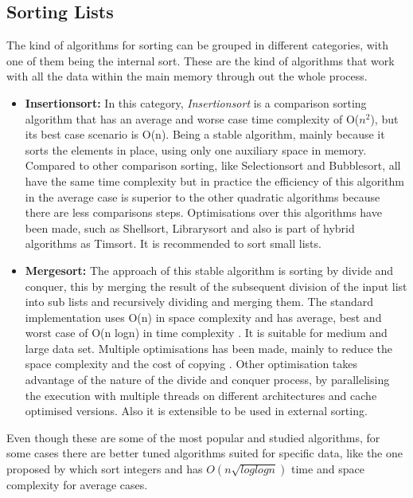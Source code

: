 \documentclass[a4paper,12pt]{article}
\begin{document}
\subsection {Sorting Lists}
The kind of algorithms for sorting can be grouped in different categories, with one of them being the internal sort. These are the kind of algorithms that work with all the data within the main memory through out the whole process.
\begin{itemize}
\item {\bf Insertionsort:}  In this category, {\it Insertionsort} is a comparison sorting algorithm that has an average and worse case time complexity of O(${n}^2$), but its best case scenario is O(n). Being a stable algorithm, mainly because it sorts the elements in place, using only one auxiliary space in memory\cite{knuth1997artInsert}. Compared to other comparison sorting, like Selectionsort and  Bubblesort, all have the same time complexity but in practice the efficiency of this algorithm in the average case is superior to the other quadratic algorithms because there are less comparisons steps. Optimisations over this algorithms have been made, such as Shellsort\cite{knuth1997artShell}, Librarysort\cite{bender2006insertion} and also is part of hybrid algorithms as Timsort\cite{Timsort}. It is recommended to sort small lists.

\item {\bf Mergesort:} The approach of this stable algorithm is sorting by divide and conquer, this by merging the result of the subsequent division of the input list into sub lists and recursively dividing and merging them. The standard implementation uses O(n) in space complexity and has average, best and worst case of O(n logn) in time complexity \cite{knuth1997artMerge}. It is suitable for medium and large data set. Multiple optimisations has been made, mainly to reduce the space complexity and the cost of copying \cite{Huang:1988:PIM:42392.42403}.  Other optimisation takes advantage of the nature of the divide and conquer process, by parallelising the execution with multiple threads \cite{chhugani2008efficient} on different architectures and cache optimised versions. Also it is extensible to be used in external sorting.
 \end{itemize}

Even though these are some of the most popular and studied algorithms, for some cases there are better tuned algorithms suited for specific data, like the one proposed by \cite{han2002integer}  which sort integers and has {$O(n \sqrt{log log n})$} time and space complexity for average cases.
\end{document}
